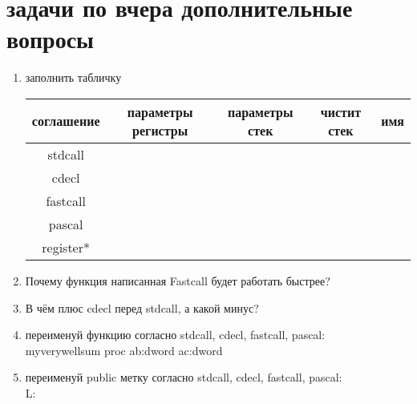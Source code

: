 \documentclass[a4paper,10pt]{article}
\begin{document}
\section*{задачи по вчера дополнительные вопросы}
\begin{enumerate}
    \item заполнить табличку \\
    \begin{tabular}{|c|c|c|c|c|}
        \hline
        соглашение & параметры регистры & параметры стек & чистит стек & имя \\
        \hline
        stdcall & & & & \\
        \hline
        cdecl & & & & \\
        \hline
        fastcall & & & & \\
        \hline
        pascal & & & & \\
        \hline
        register* & & & & \\
        \hline
    \end{tabular}
    \item Почему функция написанная Fastcall будет работать быстрее?
    \item В чём плюс cdecl перед stdcall, а какой минус?
    \item переименуй функцию согласно stdcall, cdecl, fastcall, pascal: \\
    myverywellsum proc ab:dword ac:dword
    \item переименуй public метку согласно stdcall, cdecl, fastcall, pascal: \\
    L: \\
\end{enumerate}
\end{document}
